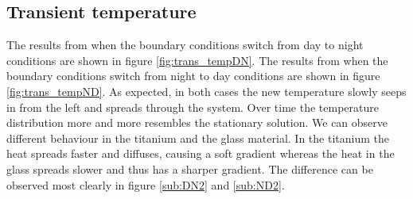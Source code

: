 \documentclass[a4paper,11pt]{article}
\begin{document}
\subsection{Transient temperature}
The results from when the boundary conditions switch from day to night conditions are shown in figure \ref{fig:trans_tempDN}. The results from when the boundary conditions switch from night to day conditions are shown in figure \ref{fig:trans_tempND}. As expected, in both cases the new temperature slowly seeps in from the left and spreads through the system. Over time the temperature distribution more and more resembles the stationary solution. We can observe different behaviour in the titanium and the glass material. In the titanium the heat spreads faster and diffuses, causing a soft gradient whereas the heat in the glass spreads slower and thus has a sharper gradient. The difference can be observed most clearly in figure \ref{sub:DN2} and \ref{sub:ND2}.
\end{document}
